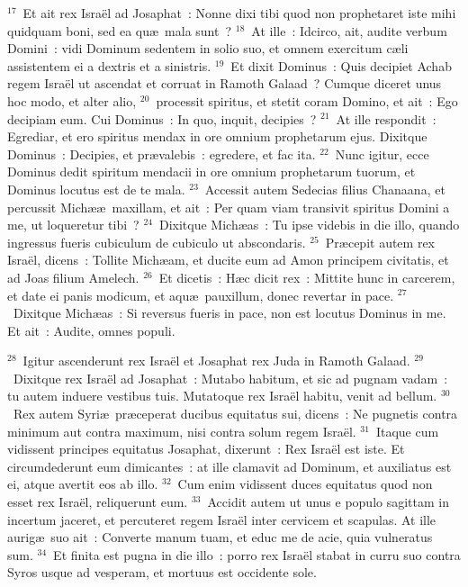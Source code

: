 ${}^{17}$~Et ait rex Isra\"el ad Josaphat~: Nonne dixi tibi quod non prophetaret iste mihi quidquam boni, sed ea qu\ae\ mala sunt~?
${}^{18}$~At ille~: Idcirco, ait, audite verbum Domini~: vidi Dominum sedentem in solio suo, et omnem exercitum c\ae li assistentem ei a dextris et a sinistris.
${}^{19}$~Et dixit Dominus~: Quis decipiet Achab regem Isra\"el ut ascendat et corruat in Ramoth Galaad~? Cumque diceret unus hoc modo, et alter alio,
${}^{20}$~processit spiritus, et stetit coram Domino, et ait~: Ego decipiam eum. Cui Dominus~: In quo, inquit, decipies~?
${}^{21}$~At ille respondit~: Egrediar, et ero spiritus mendax in ore omnium prophetarum ejus. Dixitque Dominus~: Decipies, et pr\ae valebis~: egredere, et fac ita.
${}^{22}$~Nunc igitur, ecce Dominus dedit spiritum mendacii in ore omnium prophetarum tuorum, et Dominus locutus est de te mala.
${}^{23}$~Accessit autem Sedecias filius Chanaana, et percussit Mich\ae \ae\ maxillam, et ait~: Per quam viam transivit spiritus Domini a me, ut loqueretur tibi~?
${}^{24}$~Dixitque Mich\ae as~: Tu ipse videbis in die illo, quando ingressus fueris cubiculum de cubiculo ut abscondaris.
${}^{25}$~Pr\ae cepit autem rex Isra\"el, dicens~: Tollite Mich\ae am, et ducite eum ad Amon principem civitatis, et ad Joas filium Amelech.
${}^{26}$~Et dicetis~: H\ae c dicit rex~: Mittite hunc in carcerem, et date ei panis modicum, et aqu\ae\ pauxillum, donec revertar in pace.
${}^{27}$~Dixitque Mich\ae as~: Si reversus fueris in pace, non est locutus Dominus in me. Et ait~: Audite, omnes populi.


${}^{28}$~Igitur ascenderunt rex Isra\"el et Josaphat rex Juda in Ramoth Galaad.
${}^{29}$~Dixitque rex Isra\"el ad Josaphat~: Mutabo habitum, et sic ad pugnam vadam~: tu autem induere vestibus tuis. Mutatoque rex Isra\"el habitu, venit ad bellum.
${}^{30}$~Rex autem Syri\ae\ pr\ae ceperat ducibus equitatus sui, dicens~: Ne pugnetis contra minimum aut contra maximum, nisi contra solum regem Isra\"el.
${}^{31}$~Itaque cum vidissent principes equitatus Josaphat, dixerunt~: Rex Isra\"el est iste. Et circumdederunt eum dimicantes~: at ille clamavit ad Dominum, et auxiliatus est ei, atque avertit eos ab illo.
${}^{32}$~Cum enim vidissent duces equitatus quod non esset rex Isra\"el, reliquerunt eum.
${}^{33}$~Accidit autem ut unus e populo sagittam in incertum jaceret, et percuteret regem Isra\"el inter cervicem et scapulas. At ille aurig\ae\ suo ait~: Converte manum tuam, et educ me de acie, quia vulneratus sum.
${}^{34}$~Et finita est pugna in die illo~: porro rex Isra\"el stabat in curru suo contra Syros usque ad vesperam, et mortuus est occidente sole.

